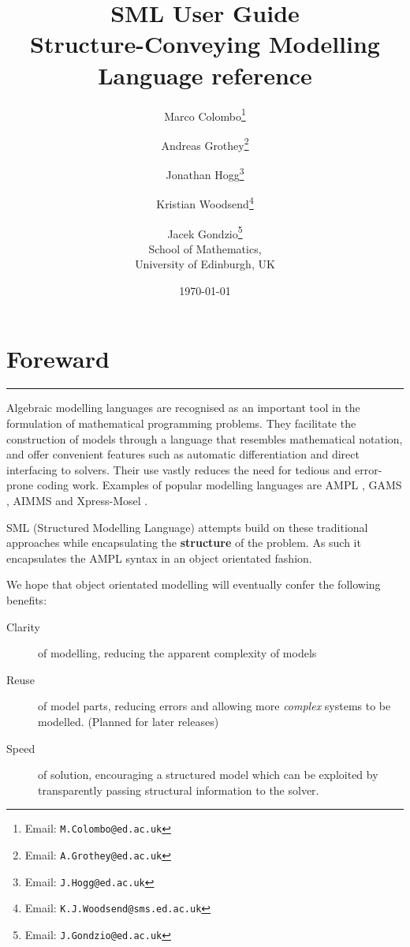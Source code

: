 \documentclass[10pt,a4paper]{book}
\begin{document}
\title{SML User Guide \\
Structure-Conveying Modelling Language reference}
\author{Marco Colombo\thanks{Email: {\tt M.Colombo@ed.ac.uk}}
\and Andreas Grothey\thanks{Email: {\tt A.Grothey@ed.ac.uk}}
\and Jonathan Hogg\thanks{Email: {\tt J.Hogg@ed.ac.uk}}
\and Kristian Woodsend\thanks{Email: {\tt K.J.Woodsend@sms.ed.ac.uk}}
\and Jacek Gondzio\thanks{Email: {\tt J.Gondzio@ed.ac.uk}} \\[3ex]
School of Mathematics, \\ University of Edinburgh, UK
}

\date{\today}

\maketitle

\section*{Foreward}
\vspace{-0.6cm}\rule{\textwidth}{0.4ex}\vspace{0.1cm}
\label{sec:Intro}

Algebraic modelling languages are recognised as an important tool in the
formulation of mathematical programming problems. They facilitate the
construction of models through a language that resembles mathematical
notation, and offer convenient features such as automatic differentiation and
direct interfacing to solvers. Their use vastly reduces the need for tedious
and error-prone coding work. Examples of popular modelling languages
are AMPL \cite{mybib:AMPL}, GAMS \cite{mybib:GAMS}, AIMMS \cite{mybib:AIMMS}
and Xpress-Mosel \cite{mybib:Mosel}.

SML (Structured Modelling Language) attempts build on these traditional
approaches while encapsulating the {\bf structure} of the problem. As such
it encapsulates the AMPL syntax in an object orientated fashion.

We hope that object orientated modelling will eventually confer the following benefits:
\begin{description}
   \item[Clarity] of modelling, reducing the apparent complexity of models
   \item[Reuse] of model parts, reducing errors and allowing more {\it complex}
      systems to be modelled. (Planned for later releases)
   \item[Speed] of solution, encouraging a structured model which can be
      exploited by transparently passing structural information to the solver.
\end{description}
\end{document}
